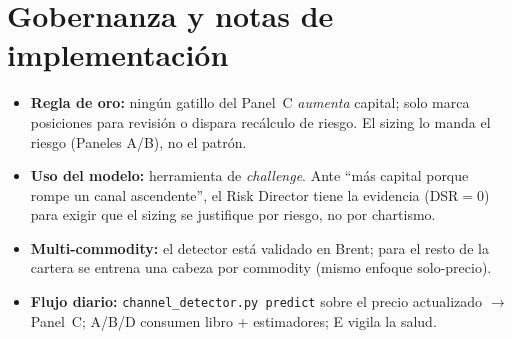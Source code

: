 \documentclass[11pt]{article}
\begin{document}
\section{Gobernanza y notas de implementaci\'on}
\begin{itemize}
\item \textbf{Regla de oro:} ning\'un gatillo del Panel~C \emph{aumenta} capital; solo marca
posiciones para revisi\'on o dispara rec\'alculo de riesgo. El sizing lo manda el riesgo
(Paneles A/B), no el patr\'on.
\item \textbf{Uso del modelo:} herramienta de \emph{challenge}. Ante ``m\'as capital porque
rompe un canal ascendente'', el Risk Director tiene la evidencia (DSR$=0$) para exigir que
el sizing se justifique por riesgo, no por chartismo.
\item \textbf{Multi-commodity:} el detector est\'a validado en Brent; para el resto de la
cartera se entrena una cabeza por commodity (mismo enfoque solo-precio).
\item \textbf{Flujo diario:} \texttt{channel\_detector.py predict} sobre el precio actualizado
$\to$ Panel~C; A/B/D consumen libro + estimadores; E vigila la salud.
\end{itemize}
\end{document}
